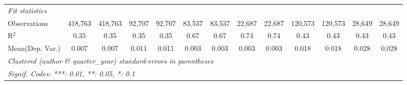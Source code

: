 \begin{tabular}{lcccccccccccc}
   \midrule
   \emph{Fit statistics}\\
   Observations                             & 418,763       & 418,763      & 92,707         & 92,707         & 83,537      & 83,537         & 22,687  & 22,687        & 120,573      & 120,573  & 28,649        & 28,649\\  
   R$^2$                                    & 0.35          & 0.35         & 0.35           & 0.35           & 0.67        & 0.67           & 0.74    & 0.74          & 0.43         & 0.43     & 0.43          & 0.43\\  
Mean(Dep. Var.) & 0.007 & 0.007 & 0.011 & 0.011 & 0.003 & 0.003 & 0.003 & 0.003 & 0.018 & 0.018 & 0.028 & 0.028 \\
   \midrule \midrule
   \multicolumn{13}{l}{\emph{Clustered (author \& quarter\_year) standard-errors in parentheses}}\\
   \multicolumn{13}{l}{\emph{Signif. Codes: ***: 0.01, **: 0.05, *: 0.1}}\\
\end{tabular}
\par\endgroup
